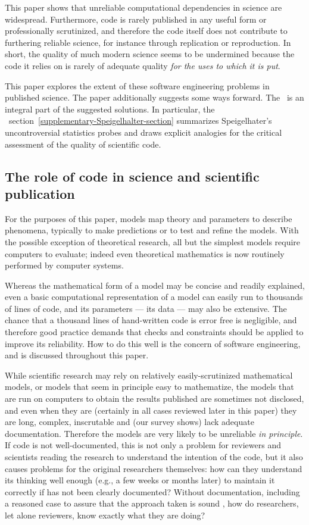 \documentclass{comjnl}
\begin{document}
This paper shows that unreliable computational dependencies in science are widespread. Furthermore, code is rarely published in any useful form or professionally scrutinized, and therefore the code itself does not contribute to furthering reliable science, for instance through replication or reproduction. In short, the quality of much modern science seems to be undermined because the code it relies on is rarely of adequate quality \emph{for the uses to which it is put}. 

This paper explores the extent of these software engineering problems in published science. The paper additionally suggests some ways forward. The \supplement\ is an integral part of the suggested solutions. In particular, the \supplement\ section~\ref{supplementary-Speigelhalter-section} summarizes Speigelhater's uncontroversial statistics probes and draws explicit analogies for the critical assessment of the quality of scientific code.

\subsection{The role of code in science and scientific publication}

For the purposes of this paper, models map theory and parameters to describe phenomena, typically to make predictions or to test and refine the models. With the possible exception of theoretical research, all but the simplest models require computers to evaluate; indeed even theoretical mathematics is now routinely performed by computer systems.

Whereas the mathematical form of a model may be concise and readily explained, even a basic computational representation of a model can easily run to thousands of lines of code, and its parameters --- its data --- may also be extensive. The chance that a thousand lines of hand-written code is error free is negligible, and therefore good practice demands that checks and constraints should be applied to improve its reliability. How to do this well is the concern of software engineering, and is discussed throughout this paper. 

While scientific research may rely on relatively easily-scrutinized mathematical models, or models that seem in principle easy to mathematize, the models that are run on computers to obtain the results published are sometimes not disclosed, and even when they are (certainly in all cases reviewed later in this paper) they are long, complex, inscrutable and (our survey shows) lack adequate documentation. Therefore the models are very likely to be unreliable \emph{in principle}. If code is not well-documented, this is not only a problem for reviewers and scientists reading the research to understand the intention of the code, but it also causes problems for the original researchers themselves: how can they understand its thinking well enough (e.g., a few weeks or months later) to maintain it correctly if has not been clearly documented? Without documentation, including a reasoned case to assure that the approach taken is sound \cite{assurance-case}, how do researchers, let alone reviewers, know exactly what they are doing?
\end{document}
